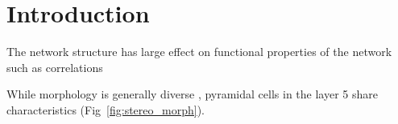 \clearpage
\pagebreak
\newpage
\section*{Introduction}

The network structure has large effect on functional properties of the network such as correlations \cite{Pernice2011}





While morphology is generally diverse , pyramidal cells in the layer 5 share characteristics (Fig~\ref{fig:stereo_morph}). 



